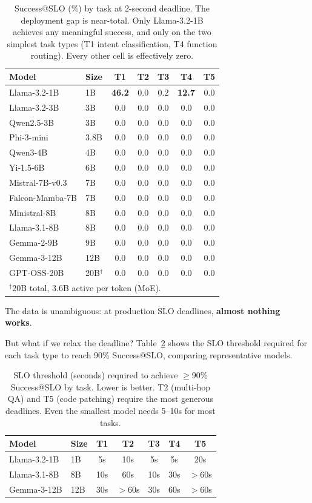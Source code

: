 \documentclass[11pt]{article}
\begin{document}
\begin{table}[t]
\centering
\caption{Success@SLO (\%) by task at 2-second deadline.  The deployment gap is near-total.  Only Llama-3.2-1B achieves any meaningful success, and only on the two simplest task types (T1 intent classification, T4 function routing).  Every other cell is effectively zero.}
\label{tab:per-task}
\small
\begin{tabular}{llccccc}
\toprule
\textbf{Model} & \textbf{Size} & \textbf{T1} & \textbf{T2} & \textbf{T3} & \textbf{T4} & \textbf{T5} \\
\midrule
Llama-3.2-1B & 1B & \textbf{46.2} & 0.0 & 0.2 & \textbf{12.7} & 0.0 \\
Llama-3.2-3B & 3B & 0.0 & 0.0 & 0.0 & 0.0 & 0.0 \\
Qwen2.5-3B & 3B & 0.0 & 0.0 & 0.0 & 0.0 & 0.0 \\
Phi-3-mini & 3.8B & 0.0 & 0.0 & 0.0 & 0.0 & 0.0 \\
Qwen3-4B & 4B & 0.0 & 0.0 & 0.0 & 0.0 & 0.0 \\
Yi-1.5-6B & 6B & 0.0 & 0.0 & 0.0 & 0.0 & 0.0 \\
Mistral-7B-v0.3 & 7B & 0.0 & 0.0 & 0.0 & 0.0 & 0.0 \\
Falcon-Mamba-7B & 7B & 0.0 & 0.0 & 0.0 & 0.0 & 0.0 \\
Ministral-8B & 8B & 0.0 & 0.0 & 0.0 & 0.0 & 0.0 \\
Llama-3.1-8B & 8B & 0.0 & 0.0 & 0.0 & 0.0 & 0.0 \\
Gemma-2-9B & 9B & 0.0 & 0.0 & 0.0 & 0.0 & 0.0 \\
Gemma-3-12B & 12B & 0.0 & 0.0 & 0.0 & 0.0 & 0.0 \\
GPT-OSS-20B & 20B$^\dagger$ & 0.0 & 0.0 & 0.0 & 0.0 & 0.0 \\
\bottomrule
\multicolumn{7}{l}{\footnotesize $^\dagger$20B total, 3.6B active per token (MoE).}
\end{tabular}
\end{table}

The data is unambiguous: at production SLO deadlines, \textbf{almost nothing works}.

But what if we relax the deadline? Table~\ref{tab:slo-threshold} shows the SLO threshold required for each task type to reach 90\% Success@SLO, comparing representative models.

\begin{table}[t]
\centering
\caption{SLO threshold (seconds) required to achieve $\geq$90\% Success@SLO by task.  Lower is better.  T2 (multi-hop QA) and T5 (code patching) require the most generous deadlines.  Even the smallest model needs 5--10s for most tasks.}
\label{tab:slo-threshold}
\small
\begin{tabular}{llccccc}
\toprule
\textbf{Model} & \textbf{Size} & \textbf{T1} & \textbf{T2} & \textbf{T3} & \textbf{T4} & \textbf{T5} \\
\midrule
Llama-3.2-1B & 1B & 5s & 10s & 5s & 5s & 20s \\
Llama-3.1-8B & 8B & 10s & 60s & 10s & 30s & $>$60s \\
Gemma-3-12B & 12B & 30s & $>$60s & 30s & 60s & $>$60s \\
\bottomrule
\end{tabular}
\end{table}
\end{document}
